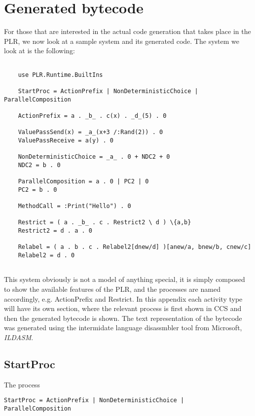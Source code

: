 \chapter{Generated bytecode}

  For those that are interested in the actual code generation that takes place 
  in the PLR, we now look at a sample system and its generated code. The 
  system we look at is the following:
  
  \begin{verbatim}

	use PLR.Runtime.BuiltIns
	
	StartProc = ActionPrefix | NonDeterministicChoice | ParallelComposition
	
	ActionPrefix = a . _b_ . c(x) . _d_(5) . 0
	
	ValuePassSend(x) = _a_(x+3 /:Rand(2)) . 0
	ValuePassReceive = a(y) . 0
	
	NonDeterministicChoice = _a_ . 0 + NDC2 + 0
	NDC2 = b . 0
	 
	ParallelComposition = a . 0 | PC2 | 0 
	PC2 = b . 0
	
	MethodCall = :Print("Hello") . 0
	
	Restrict = ( a . _b_ . c . Restrict2 \ d ) \{a,b}
	Restrict2 = d . a . 0
	
	Relabel = ( a . b . c . Relabel2[dnew/d] )[anew/a, bnew/b, cnew/c]
	Relabel2 = d . 0
  
  \end{verbatim}

  This system obviously is not a model of anything special, it is simply 
  composed to show the available features of the PLR, and the processes are 
  named accordingly, e.g. ActionPrefix and Restrict. In this appendix each 
  activity type will have its own section, where the relevant process is first 
  shown in CCS and then the generated bytecode is shown. The text 
  representation of the bytecode was generated using the intermidate language 
  disassmbler tool from Microsoft, \textit{ILDASM}.
  
  \section{StartProc}

	The process
	
	\begin{verbatim}StartProc = ActionPrefix | NonDeterministicChoice | ParallelComposition\end{verbatim}
	
